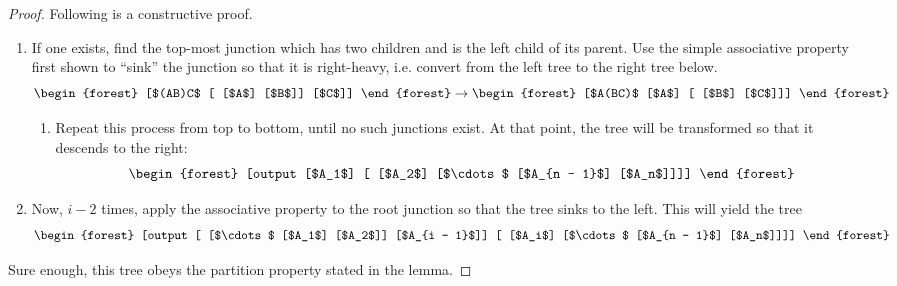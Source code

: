 \documentclass[draft,12pt]{report}
\begin{document}
\begin{proof}
    Following is a constructive proof.
    \begin{enumerate}
        \item If one exists, find the top-most junction which has two children and is the left child of its parent. Use the simple associative property first shown to ``sink'' the junction so that it is right-heavy, i.e. convert from the left tree to the right tree below.
        \[ \begin{forest}
            [$(AB)C$
                [
                    [$A$]
                    [$B$]]
                [$C$]]
        \end{forest} \to \begin{forest}
            [$A(BC)$
                [$A$]
                [
                    [$B$]
                    [$C$]]]
        \end{forest} \]
        \begin{enumerate}
            \item Repeat this process from top to bottom, until no such junctions exist. At that point, the tree will be transformed so that it descends to the right:
            \[ \begin{forest}
                [output
                    [$A_1$]
                    [
                        [$A_2$]
                        [$\cdots$
                            [$A_{n - 1}$]
                            [$A_n$]]]]
            \end{forest} \]
        \end{enumerate}
        \item Now, $i - 2$ times, apply the associative property to the root junction so that the tree sinks to the left. This will yield the tree
        \[ \begin{forest}
            [output
                [
                    [$\cdots$
                        [$A_1$]
                        [$A_2$]]
                    [$A_{i - 1}$]]
                [
                    [$A_i$]
                    [$\cdots$
                        [$A_{n - 1}$]
                        [$A_n$]]]]
        \end{forest} \]
    \end{enumerate}
    Sure enough, this tree obeys the partition property stated in the lemma.
\end{proof}
\end{document}
